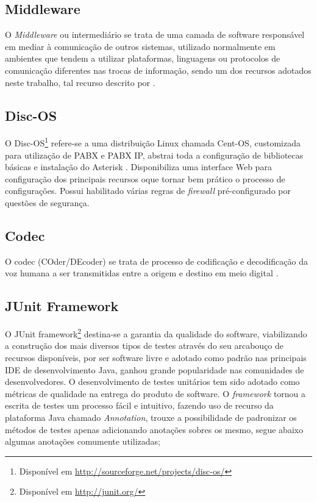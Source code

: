 \subsection{Middleware}
O \textit{Middleware} ou intermediário se trata de uma camada de software responsável em mediar à comunicação de outros sistemas, utilizado normalmente em ambientes que tendem a utilizar plataformas, linguagens ou protocolos de comunicação diferentes nas trocas de informação, sendo um dos recursos adotados neste trabalho, tal recurso descrito por .

\subsection{Disc-OS}
O Disc-OS\footnote{Disponível em \url{http://sourceforge.net/projects/disc-os/}}\label{key:DISC-OS} refere-se a uma distribuição Linux chamada Cent-OS, customizada para utilização de PABX e PABX IP, abstrai toda a configuração de bibliotecas básicas e instalação do Asterisk \cite{DARU:2008}. Disponibiliza uma interface Web para configuração dos principais recursos oque tornar bem prático o processo de configurações. Possui habilitado várias regras de \textit{firewall} pré-configurado por questões de segurança.

\subsection{Codec}
O codec (COder/DEcoder) se trata de processo de codificação e decodificação da voz humana a ser transmitidas entre a origem e destino em meio digital \cite{VIEIRA:2007}.

\subsection{JUnit Framework}
O JUnit framework\footnote{Disponível em \url{http://junit.org/}} destina-se a garantia da qualidade do software, viabilizando a construção dos mais diversos tipos de testes através do seu arcabouço de recursos disponíveis, por ser software livre e adotado como padrão nas principais IDE de desenvolvimento Java, ganhou grande popularidade nas comunidades de desenvolvedores. O desenvolvimento de testes unitários tem sido adotado como métricas de qualidade na entrega do produto de software.
O \textit{framework} tornou a escrita de testes um processo fácil e intuitivo, fazendo uso de recurso da plataforma Java chamado \textit{Annotation}\label{key:annotation}, trouxe a possibilidade de padronizar os métodos de testes apenas adicionando anotações sobres os mesmo, segue abaixo algumas anotações comumente utilizadas;

